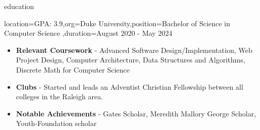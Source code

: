 \documentclass{resume}
\begin{document}
\makeheader

\newcommand{\skill}[2]{\textbf{#1} - #2}

\begin{ResumeSection}{education}
    \begin{ResumeSubsection}{location={GPA: 3.9},org={Duke University},position={Bachelor of Science in Computer Science}
        ,duration={August 2020 - May 2024}}
        \begin{itemize}
            \item \skill{Relevant Coursework}{Advanced Software Design/Implementation, Web Project Design, Computer Architecture,
                Data Structures and Algorithms, Discrete Math for Computer Science}
            \item \skill{Clubs}{Started and leads an Adventist Christian
                Fellowship between all colleges in the Raleigh area.}
            \item \skill{Notable Achievements}{Gates Scholar, Meredith Mallory
                George Scholar, Youth-Foundation scholar}
        \end{itemize}
    \end{ResumeSubsection}
\end{ResumeSection}
\end{document}
